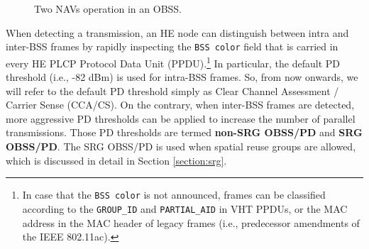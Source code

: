 \documentclass[comsoc]{IEEEtran}
\begin{document}
	\begin{figure}[ht!]
		\centering
		\hspace{1cm}
		\caption{Two NAVs operation in an OBSS.}
		\label{fig:two_navs}
	\end{figure}
	
	When detecting a transmission, an HE node can distinguish between intra and inter-BSS frames by rapidly inspecting the \texttt{BSS color} field that is carried in every HE PLCP Protocol Data Unit (PPDU).\footnote{In case that the \texttt{BSS color} is not announced, frames can be classified according to the \texttt{GROUP\_ID} and \texttt{PARTIAL\_AID} in VHT PPDUs, or the MAC address in the MAC header of legacy frames (i.e., predecessor amendments of the IEEE 802.11ac).} In particular, the default PD threshold (i.e., -82 dBm) is used for intra-BSS frames. So, from now onwards, we will refer to the default PD threshold simply as Clear Channel Assessment / Carrier Sense (CCA/CS). On the contrary, when inter-BSS frames are detected, more aggressive PD thresholds can be applied to increase the number of parallel transmissions. Those PD thresholds are termed \textbf{non-SRG OBSS/PD} and \textbf{SRG OBSS/PD}. The SRG OBSS/PD is used when spatial reuse groups are allowed, which is discussed in detail in Section \ref{section:srg}.
	
\end{document}
